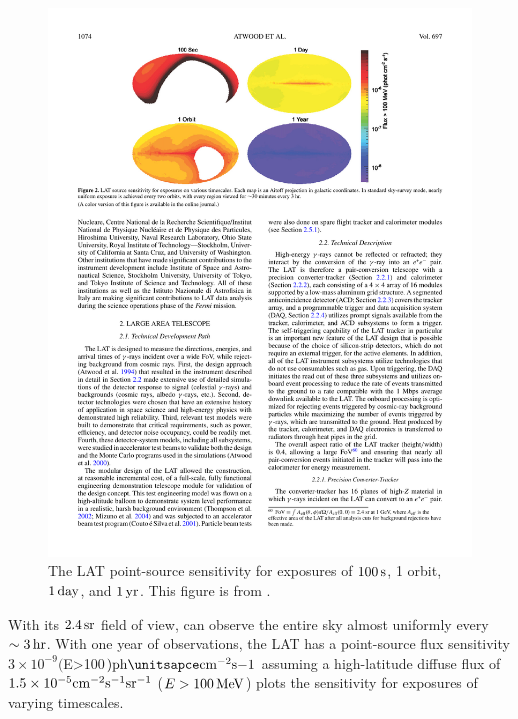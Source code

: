 \begin{figure}[htbp]
  \centering
  \includegraphics{chapters/introduction/figures/lat_point_source_sensitivity.pdf}
  \caption{
  The \ac{LAT} point-source sensitivity for exposures of
  $100\,\text{s}$, 1 orbit, $1\,\text{day}$,
  and $1\,\text{yr}$.  This figure is from
  \cite{atwood_2009a_large-telescope}.
  }
\end{figure} 

With its $2.4\,\text{sr}$ field of view, \fermi can observe
the entire sky almost uniformly every $\sim3\,\text{hr}$.
With one year of observations, the \ac{LAT} has a point-source
flux sensitivity $3 \times 10^{-9} ($E>100\unitspace\mev$)
\ph\unitsapce\cm^{-2}\second{-1}$ assuming a high-latitude diffuse
flux of $1.5\times10^{-5}\text{cm}^{-2}\text{s}^{-1}\text{sr}^{-1}$
($E>100\,\text{MeV}$)  plots the
sensitivity for exposures of varying timescales.

